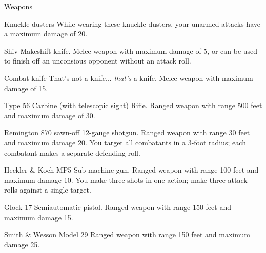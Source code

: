 
\begin{abstractsection}{Weapons}
\vspace{1ex}

\begin{describe}{Knuckle dusters}
  While wearing these knuckle dusters, your unarmed attacks have a maximum damage of 20.
\end{describe}

\begin{describe}{Shiv}
  Makeshift knife. Melee weapon with maximum damage of 5, or can be used to finish off an unconsious opponent without an attack roll.
\end{describe}

\begin{describe}{Combat knife}
  That's not a knife... \emph{that's} a knife. Melee weapon with maximum damage of 15.
\end{describe}

\begin{describe}{Type 56 Carbine (with telescopic sight)}
  Rifle. Ranged weapon with range 500 feet and maximum damage of 30.
\end{describe}

\begin{describe}{Remington 870 sawn-off}
  12-gauge shotgun. Ranged weapon with range 30 feet and maximum damage 20. You target all combatants in a 3-foot radius; each combatant makes a separate defending roll.
\end{describe}

\begin{describe}{Heckler \& Koch MP5}
  Sub-machine gun. Ranged weapon with range 100 feet and maximum damage 10. You make three shots in one action; make three attack rolls against a single target.
\end{describe}

\begin{describe}{Glock 17}
  Semiautomatic pistol. Ranged weapon with range 150 feet and maximum damage 15.
\end{describe}

\begin{describe}{Smith \& Wesson Model 29}
  Ranged weapon with range 150 feet and maximum damage 25.
\end{describe}
\end{abstractsection}

